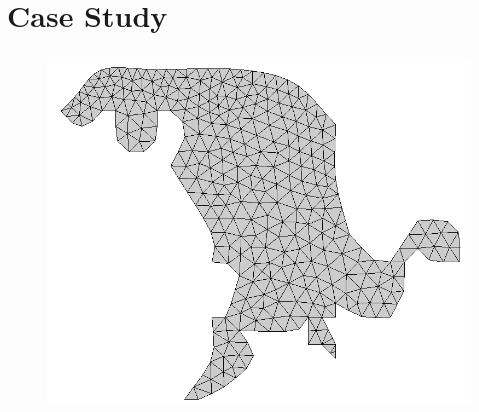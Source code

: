 \section{Case Study}

\begin{frame}[plain]
	\frametitle{\polu}
	\begin{figure}
		\centering
		\begin{columns}
			\includegraphics[width=\textwidth]{images/foz_msh.png}
			\pause

\end{columns}
\end{figure}
\end{frame}
